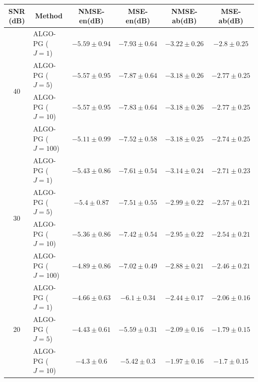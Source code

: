 \newpage

\begin{table}[h]
\centering
\begin{adjustbox}{max width=\textwidth}
\begin{tabular}{|c|l|c|c|c|c|}
\hline
SNR (dB)            & \multicolumn{1}{c|}{Method}& NMSE-en(dB)         & MSE-en(dB)          & NMSE-ab(dB)         & MSE-ab(dB)          \tabularnewline \hline
\multirow{4}{*}{40} & ALGO-PG ($J=1$)            & $-5.59    \pm 0.94$ & $-7.93    \pm 0.64$ & $-3.22    \pm 0.26$ & $-2.8     \pm 0.25$ \tabularnewline
                    & ALGO-PG ($J=5$)            & $-5.57    \pm 0.95$ & $-7.87    \pm 0.64$ & $-3.18    \pm 0.26$ & $-2.77    \pm 0.25$ \tabularnewline
                    & ALGO-PG ($J=10$)           & $-5.57    \pm 0.95$ & $-7.83    \pm 0.64$ & $-3.18    \pm 0.26$ & $-2.77    \pm 0.25$ \tabularnewline
                    & ALGO-PG ($J=100$)          & $-5.11    \pm 0.99$ & $-7.52    \pm 0.58$ & $-3.18    \pm 0.25$ & $-2.74    \pm 0.25$ \tabularnewline \hline
\multirow{4}{*}{30} & ALGO-PG ($J=1$)            & $-5.43    \pm 0.86$ & $-7.61    \pm 0.54$ & $-3.14    \pm 0.24$ & $-2.71    \pm 0.23$ \tabularnewline
                    & ALGO-PG ($J=5$)            & $-5.4     \pm 0.87$ & $-7.51    \pm 0.55$ & $-2.99    \pm 0.22$ & $-2.57    \pm 0.21$ \tabularnewline
                    & ALGO-PG ($J=10$)           & $-5.36    \pm 0.86$ & $-7.42    \pm 0.54$ & $-2.95    \pm 0.22$ & $-2.54    \pm 0.21$ \tabularnewline
                    & ALGO-PG ($J=100$)          & $-4.89    \pm 0.86$ & $-7.02    \pm 0.49$ & $-2.88    \pm 0.21$ & $-2.46    \pm 0.21$ \tabularnewline \hline
\multirow{4}{*}{20} & ALGO-PG ($J=1$)            & $-4.66    \pm 0.63$ & $-6.1     \pm 0.34$ & $-2.44    \pm 0.17$ & $-2.06    \pm 0.16$ \tabularnewline
                    & ALGO-PG ($J=5$)            & $-4.43    \pm 0.61$ & $-5.59    \pm 0.31$ & $-2.09    \pm 0.16$ & $-1.79    \pm 0.15$ \tabularnewline
                    & ALGO-PG ($J=10$)           & $-4.3     \pm 0.6$  & $-5.42    \pm 0.3$  & $-1.97    \pm 0.16$ & $-1.7     \pm 0.15$ \tabularnewline

\end{tabular}
\end{adjustbox}
\end{table}
